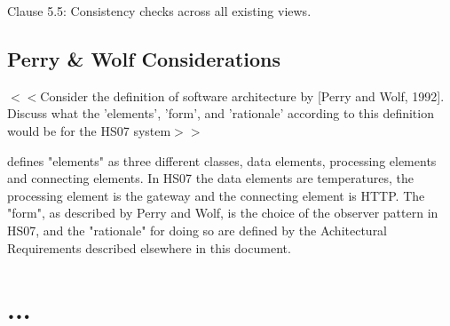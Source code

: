 \documentclass[a4paper,10pt]{article}
\begin{document}
Clause 5.5: Consistency checks across all existing views.

\subsection{Perry \& Wolf Considerations}
$<<$Consider the definition of software architecture by [Perry and Wolf, 1992]. Discuss what the 'elements', 'form', and 'rationale' according to this definition would be for the HS07 system$>>$

\cite{perrywolf1992} defines "elements" as three different classes, data elements, processing elements and connecting elements. In HS07 the data elements are temperatures, the processing element is the gateway and the connecting element is HTTP. The "form", as described by Perry and Wolf, is the choice of the observer pattern in HS07, and the "rationale" for doing so are defined by the Achitectural Requirements described elsewhere in this document.

\section{...}



\end{document}

